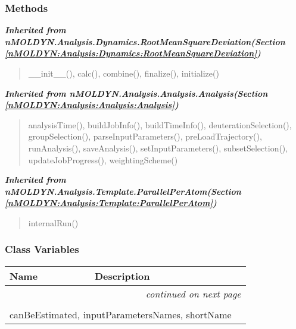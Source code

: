 
  \subsubsection{Methods}


\large{\textbf{\textit{Inherited from nMOLDYN.Analysis.Dynamics.RootMeanSquareDeviation\textit{(Section \ref{nMOLDYN:Analysis:Dynamics:RootMeanSquareDeviation})}}}}

\begin{quote}
\_\_init\_\_(), calc(), combine(), finalize(), initialize()
\end{quote}

\large{\textbf{\textit{Inherited from nMOLDYN.Analysis.Analysis.Analysis\textit{(Section \ref{nMOLDYN:Analysis:Analysis:Analysis})}}}}

\begin{quote}
analysisTime(), buildJobInfo(), buildTimeInfo(), deuterationSelection(), groupSelection(), parseInputParameters(), preLoadTrajectory(), runAnalysis(), saveAnalysis(), setInputParameters(), subsetSelection(), updateJobProgress(), weightingScheme()
\end{quote}

\large{\textbf{\textit{Inherited from nMOLDYN.Analysis.Template.ParallelPerAtom\textit{(Section \ref{nMOLDYN:Analysis:Template:ParallelPerAtom})}}}}

\begin{quote}
internalRun()
\end{quote}


  \subsubsection{Class Variables}

    \vspace{-1cm}
\hspace{\varindent}\begin{longtable}{|p{\varnamewidth}|p{\vardescrwidth}|l}
\cline{1-2}
\cline{1-2} \centering \textbf{Name} & \centering \textbf{Description}& \\
\cline{1-2}
\endhead\cline{1-2}\multicolumn{3}{r}{\small\textit{continued on next page}}\\\endfoot\cline{1-2}
\endlastfoot\multicolumn{2}{|l|}{\textit{Inherited from nMOLDYN.Analysis.Dynamics.RootMeanSquareDeviation \textit{(Section \ref{nMOLDYN:Analysis:Dynamics:RootMeanSquareDeviation})}}}\\
\multicolumn{2}{|p{\varwidth}|}{\raggedright canBeEstimated, inputParametersNames, shortName}\\
\cline{1-2}
\end{longtable}

